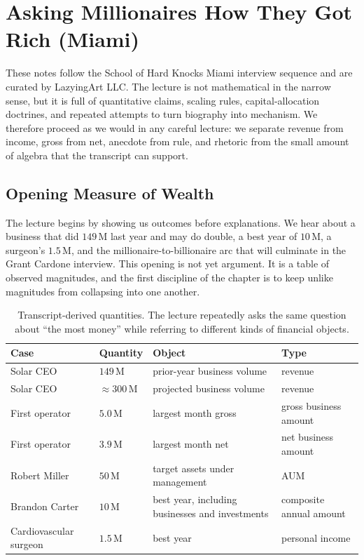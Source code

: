 \chapter{Asking Millionaires How They Got Rich (Miami)}

These notes follow the School of Hard Knocks Miami interview sequence and are curated by LazyingArt LLC. The lecture is not mathematical in the narrow sense, but it is full of quantitative claims, scaling rules, capital-allocation doctrines, and repeated attempts to turn biography into mechanism. We therefore proceed as we would in any careful lecture: we separate revenue from income, gross from net, anecdote from rule, and rhetoric from the small amount of algebra that the transcript can support.

\section{Opening Measure of Wealth}

The lecture begins by showing us outcomes before explanations. We hear about a business that did \(149\,\mathrm{M}\) last year and may do double, a best year of \(10\,\mathrm{M}\), a surgeon's \(1.5\,\mathrm{M}\), and the millionaire-to-billionaire arc that will culminate in the Grant Cardone interview. This opening is not yet argument. It is a table of observed magnitudes, and the first discipline of the chapter is to keep unlike magnitudes from collapsing into one another.

\begin{table}[h]
\centering
\begin{tabular}{llll}
\hline
Case & Quantity & Object & Type \\
\hline
Solar CEO & \(149\,\mathrm{M}\) & prior-year business volume & revenue \\
Solar CEO & \(\approx 300\,\mathrm{M}\) & projected business volume & revenue \\
First operator & \(5.0\,\mathrm{M}\) & largest month gross & gross business amount \\
First operator & \(3.9\,\mathrm{M}\) & largest month net & net business amount \\
Robert Miller & \(50\,\mathrm{M}\) & target assets under management & AUM \\
Brandon Carter & \(10\,\mathrm{M}\) & best year, including businesses and investments & composite annual amount \\
Cardiovascular surgeon & \(1.5\,\mathrm{M}\) & best year & personal income \\
\hline
\end{tabular}
\caption{Transcript-derived quantities. The lecture repeatedly asks the same question about ``the most money'' while referring to different kinds of financial objects.}
\end{table}

